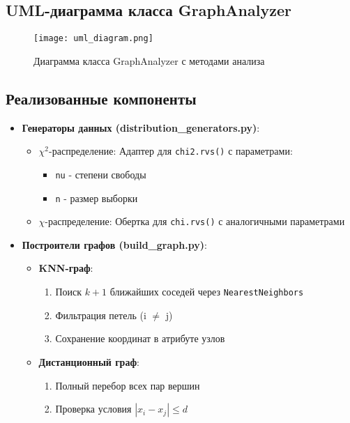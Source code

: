 \documentclass[a4paper, 12pt]{article}
\begin{document}
\subsection{UML-диаграмма класса GraphAnalyzer}
\begin{figure}[H]
    \centering
    \texttt{[image: uml\_diagram.png]}
    \caption{Диаграмма класса GraphAnalyzer с методами анализа}
    \label{fig:uml_graph}
\end{figure}

\subsection{Реализованные компоненты}
\begin{itemize}
    \item \textbf{Генераторы данных (distribution\_generators.py)}:
    \begin{itemize}
        \item $\chi^2$-распределение: Адаптер для \texttt{chi2.rvs()} с параметрами:
        \begin{itemize}
            \item \texttt{nu} - степени свободы
            \item \texttt{n} - размер выборки
        \end{itemize}
        \item $\chi$-распределение: Обертка для \texttt{chi.rvs()} с аналогичными параметрами
    \end{itemize}
    
    \item \textbf{Построители графов (build\_graph.py)}:
    \begin{itemize}
        \item \textbf{KNN-граф}:
        \begin{enumerate}
            \item Поиск $k+1$ ближайших соседей через \texttt{NearestNeighbors}
            \item Фильтрация петель (i $\neq$ j)
            \item Сохранение координат в атрибуте узлов
        \end{enumerate}
        
        \item \textbf{Дистанционный граф}:
        \begin{enumerate}
            \item Полный перебор всех пар вершин
            \item Проверка условия $|x_i - x_j| \leq d$
        \end{enumerate}
    \end{itemize}


\end{itemize}
\end{document}
